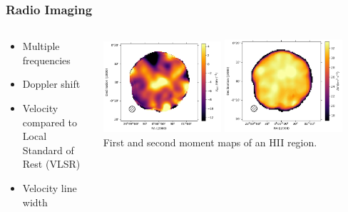 \documentclass[aspectratio=169,compress]{beamer}
\newcommand\teeny{\fontsize{3pt}{3.6pt}\selectfont}
\begin{document}
\begin{frame}
  \frametitle{Radio Imaging}
  \begin{columns}
    \begin{column}{0.4\textwidth}
      \begin{itemize}
        \item Multiple frequencies
        \item Doppler shift
        \item Velocity compared to Local Standard of Rest (VLSR)
        \item Velocity line width
      \end{itemize}
    \end{column}
    \begin{column}{0.6\textwidth}
      \centering
      \includegraphics[width=0.45\textwidth]{figures/withdensrrl_200.0_M1.png}
      \includegraphics[width=0.45\textwidth]{figures/withdensrrl_200.0_M2.png}
      {\teeny\\ First and second moment maps of an HII region.}
    \end{column}
  \end{columns}
\end{frame}
\end{document}
